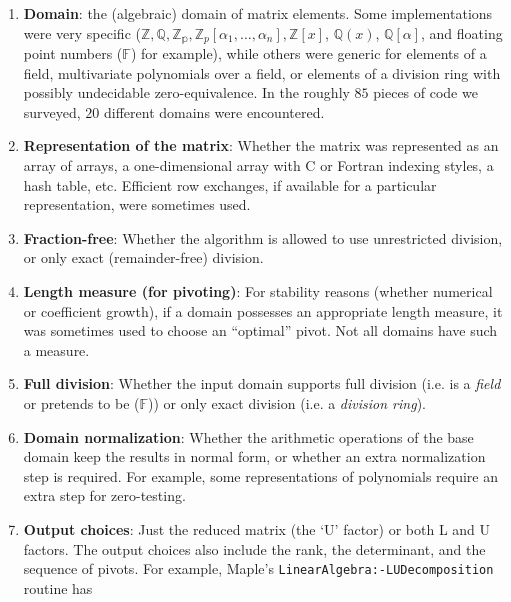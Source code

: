 \documentclass{elsart}
\newcommand{\floats}{\mathbb{F}}
\begin{document}
\begin{enumerate}
    \item \textbf{Domain}: the (algebraic) domain of matrix
        elements.  Some implementations were very specific
        ($\mathbb{Z}, \mathbb{Q}, \mathbb{Z_p}, 
        \mathbb{Z}_p\left[\alpha_1,\ldots,\alpha_n\right], 
        \mathbb{Z}\left[x\right]$, $\mathbb{Q}\left(x\right)$, 
        $\mathbb{Q}\left[\alpha\right]$, and floating point numbers 
        ($\floats$) for 
        example), while others were generic for elements of a field,
        multivariate polynomials over a field, or elements of a division ring
        with possibly undecidable zero-equivalence.  In the roughly $85$ pieces
        of code we surveyed, $20$ different domains were encountered.
    \item \textbf{Representation of the matrix}: Whether the matrix
        was represented as an array of arrays, a
        one-dimensional array with C or Fortran indexing styles, 
        a hash table, etc. Efficient row exchanges, if available for a
        particular representation, were sometimes used.
    \item \textbf{Fraction-free}: Whether the 
        algorithm is allowed to use unrestricted division, or only
        exact (remainder-free) division.
    \item \textbf{Length measure (for pivoting)}:  For stability reasons
        (whether numerical or coefficient growth), if a domain 
        possesses an appropriate length measure, it was sometimes used to
        choose an ``optimal'' pivot.  Not all domains have such a measure.
    \item \textbf{Full division}: Whether the input domain supports full
        division (i.e. is a \emph{field} or pretends to be ($\floats$)) 
        or only exact division (i.e. a \emph{division ring}).
    \item \textbf{Domain normalization}: Whether the arithmetic operations
        of the base domain keep the results in normal form, or whether
        an extra normalization step is required.  For example, some 
        representations of polynomials require an extra step for
        zero-testing.
    \item \textbf{Output choices}:  Just the reduced matrix
        (the `U' factor) or both L and U factors. The output
      choices also include
        the rank, the determinant, and the sequence of 
        pivots.  For example, Maple's
        \texttt{LinearAlgebra:\hyp LUDecomposition} routine has

\end{enumerate}
\end{document}
